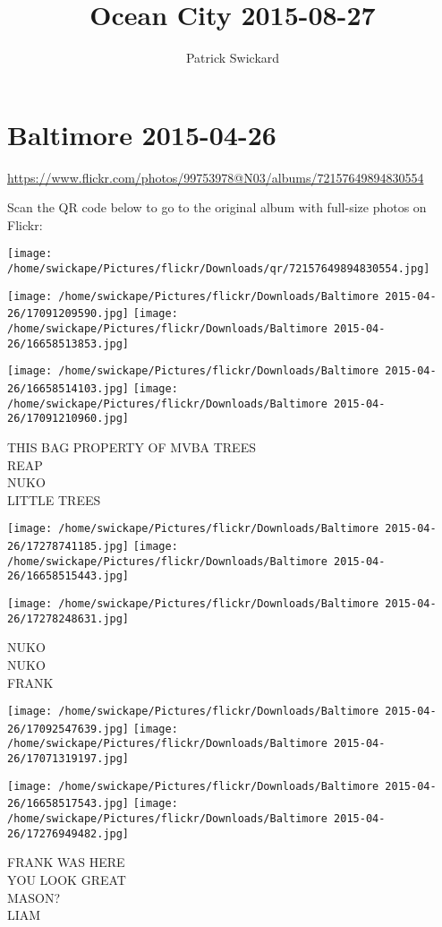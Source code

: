\documentclass[10pt,letterpaper]{article}
\title{Ocean City 2015-08-27}
\author{Patrick Swickard}
\date{}
\begin{document}
\section*{Baltimore 2015-04-26}

\url{https://www.flickr.com/photos/99753978@N03/albums/72157649894830554}

Scan the QR code below to go to the original album with full-size photos on Flickr:

\texttt{[image: /home/swickape/Pictures/flickr/Downloads/qr/72157649894830554.jpg]}
\pagebreak

\texttt{[image: /home/swickape/Pictures/flickr/Downloads/Baltimore 2015-04-26/17091209590.jpg]}
\texttt{[image: /home/swickape/Pictures/flickr/Downloads/Baltimore 2015-04-26/16658513853.jpg]}

\texttt{[image: /home/swickape/Pictures/flickr/Downloads/Baltimore 2015-04-26/16658514103.jpg]}
\texttt{[image: /home/swickape/Pictures/flickr/Downloads/Baltimore 2015-04-26/17091210960.jpg]}

THIS BAG PROPERTY OF MVBA TREES\\
REAP\\
NUKO\\
LITTLE TREES
\pagebreak

\texttt{[image: /home/swickape/Pictures/flickr/Downloads/Baltimore 2015-04-26/17278741185.jpg]}
\texttt{[image: /home/swickape/Pictures/flickr/Downloads/Baltimore 2015-04-26/16658515443.jpg]}

\vspace{0.25in}
\texttt{[image: /home/swickape/Pictures/flickr/Downloads/Baltimore 2015-04-26/17278248631.jpg]}

NUKO\\
NUKO\\
FRANK
\pagebreak

\texttt{[image: /home/swickape/Pictures/flickr/Downloads/Baltimore 2015-04-26/17092547639.jpg]}
\texttt{[image: /home/swickape/Pictures/flickr/Downloads/Baltimore 2015-04-26/17071319197.jpg]}

\texttt{[image: /home/swickape/Pictures/flickr/Downloads/Baltimore 2015-04-26/16658517543.jpg]}
\texttt{[image: /home/swickape/Pictures/flickr/Downloads/Baltimore 2015-04-26/17276949482.jpg]}

FRANK WAS HERE\\
YOU LOOK GREAT\\
MASON?\\
LIAM
\pagebreak
\end{document}
